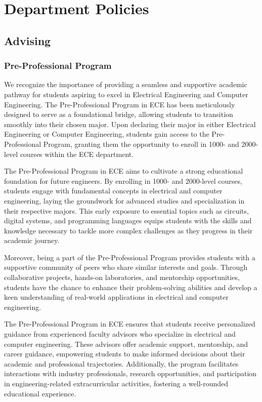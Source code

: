 \chapter{Department Policies}
\label{cha:department-policies}

\section{Advising}
\label{sec:advising}

\subsection{Pre-Professional Program}
\label{sec:pre-prof-progr}
We recognize the importance of providing a seamless and supportive academic pathway for students aspiring to excel in Electrical Engineering and Computer Engineering. The Pre-Professional Program in ECE has been meticulously designed to serve as a foundational bridge, allowing students to transition smoothly into their chosen major. Upon declaring their major in either Electrical Engineering or Computer Engineering, students gain access to the Pre-Professional Program, granting them the opportunity to enroll in 1000- and 2000-level courses within the ECE department.

The Pre-Professional Program in ECE aims to cultivate a strong educational foundation for future engineers. By enrolling in 1000- and 2000-level courses, students engage with fundamental concepts in electrical and computer engineering, laying the groundwork for advanced studies and specialization in their respective majors. This early exposure to essential topics such as circuits, digital systems, and programming languages equips students with the skills and knowledge necessary to tackle more complex challenges as they progress in their academic journey.

Moreover, being a part of the Pre-Professional Program provides students with a supportive community of peers who share similar interests and goals. Through collaborative projects, hands-on laboratories, and mentorship opportunities, students have the chance to enhance their problem-solving abilities and develop a keen understanding of real-world applications in electrical and computer engineering.

The Pre-Professional Program in ECE ensures that students receive personalized guidance from experienced faculty advisors who specialize in electrical and computer engineering. These advisors offer academic support, mentorship, and career guidance, empowering students to make informed decisions about their academic and professional trajectories. Additionally, the program facilitates interactions with industry professionals, research opportunities, and participation in engineering-related extracurricular activities, fostering a well-rounded educational experience.

